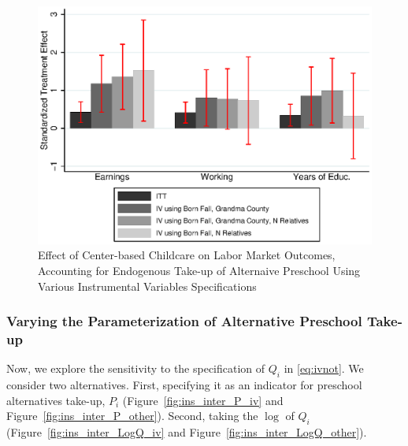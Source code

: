 \begin{appendices}
\begin{figure}[H]
		\caption{Effect of Center-based Childcare on Labor Market Outcomes, Accounting for Endogenous Take-up of Alternaive Preschool Using Various Instrumental Variables Specifications} \label{fig:inter_Q_other}
		\includegraphics[width=.5\columnwidth]{output/appendixplots/inter_Q_iv_other.eps}
\end{figure}

\subsubsection{Varying the Parameterization of Alternative Preschool Take-up}

\noindent Now, we explore the sensitivity to the specification of $Q_{i}$ in \eqref{eq:ivnot}. We consider two alternatives. First, specifying it as an indicator for preschool alternatives take-up, $P_{i}$ (Figure~\ref{fig:ins_inter_P_iv} and Figure~\ref{fig:ins_inter_P_other}). Second, taking the $\log$ of $Q_{i}$ (Figure~\ref{fig:ins_inter_LogQ_iv} and Figure~\ref{fig:ins_inter_LogQ_other}).


\end{appendices}
